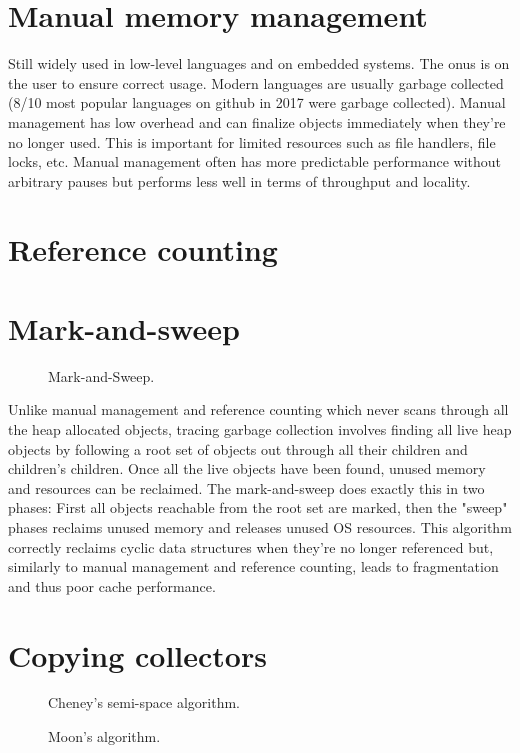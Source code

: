 \documentclass[a4paper,oneside]{memoir}
\begin{document}

\section{Manual memory management}
Still widely used in low-level languages and on embedded systems.
The onus is on the user to ensure correct usage.
Modern languages are usually garbage collected (8/10 most popular languages on
github\cite{GithubLanguages} in 2017 were garbage collected).
Manual management has low overhead and can finalize objects immediately when
they're no longer used. This is important for limited resources such as file
handlers, file locks, etc.
Manual management often has more predictable performance without arbitrary pauses
but performs less well in terms of throughput and locality.

\section{Reference counting}
\section{Mark-and-sweep}
\begin{figure}
  \centering
  
  \caption{Mark-and-Sweep.}
\end{figure}

Unlike manual management and reference counting which never scans through all
the heap allocated objects, tracing garbage collection involves finding all live
heap objects by following a root set of objects out through all their children
and children's children. Once all the live objects have been found, unused memory
and resources can be reclaimed.
The mark-and-sweep does exactly this in two phases: First all objects reachable
from the root set are marked, then the "sweep" phases reclaims unused memory and
releases unused OS resources.
This algorithm correctly reclaims cyclic data structures when they're no longer
referenced but, similarly to manual management and reference counting, leads to
fragmentation and thus poor cache performance.

\section{Copying collectors}
\begin{figure}
  \centering
  
  \caption{Cheney's semi-space algorithm.}
\end{figure}
\begin{figure}[b]
  \centering
  
  \caption{Moon's algorithm.}
\end{figure}
\end{document}
